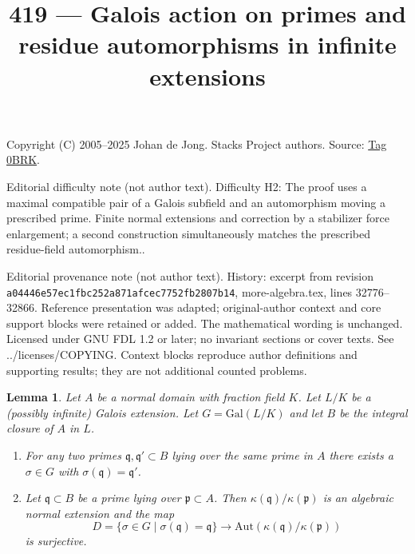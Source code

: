 \documentclass{amsart}
\theoremstyle{plain}
\newtheorem{lemma}[subsection]{Lemma}
\theoremstyle{definition}
\theoremstyle{remark}
\numberwithin{equation}{subsection}
\begin{document}
\title[Stacks Project, Tag 0BRK]{419 --- Galois action on primes and residue automorphisms in infinite extensions}
\maketitle
\noindent Copyright (C) 2005--2025 Johan de Jong. Stacks Project authors. Source: \href{https://stacks.math.columbia.edu/tag/0BRK}{Tag 0BRK}.

\noindent Editorial difficulty note (not author text). Difficulty H2: The proof uses a maximal compatible pair of a Galois subfield and an automorphism moving a prescribed prime. Finite normal extensions and correction by a stabilizer force enlargement; a second construction simultaneously matches the prescribed residue-field automorphism..

\noindent Editorial provenance note (not author text). History: excerpt from revision \texttt{a0444\allowbreak 6e57e\allowbreak c1fbc\allowbreak 252a8\allowbreak 71afc\allowbreak ec775\allowbreak 2fb28\allowbreak 07b14}, more-algebra.tex, lines 32776--32866. Reference presentation was adapted; original-author context and core support blocks were retained or added. The mathematical wording is unchanged. Licensed under GNU FDL 1.2 or later; no invariant sections or cover texts. See ../licenses/COPYING. Context blocks reproduce author definitions and supporting results; they are not additional counted problems.

\begin{lemma}
\label{lemma-one-orbit-geometric-galois}
Let $A$ be a normal domain with fraction field $K$.
Let $L/K$ be a (possibly infinite) Galois extension.
Let $G = \text{Gal}(L/K)$ and let
$B$ be the integral closure of $A$ in $L$.
\begin{enumerate}
\item For any two primes
$\mathfrak q, \mathfrak q' \subset B$ lying over the same prime in $A$
there exists a $\sigma \in G$ with $\sigma(\mathfrak q) = \mathfrak q'$.
\item Let $\mathfrak q \subset B$ be a prime lying over
$\mathfrak p \subset A$. Then $\kappa(\mathfrak q)/\kappa(\mathfrak p)$
is an algebraic normal extension and the map
$$
D = \{\sigma \in G \mid \sigma(\mathfrak q) = \mathfrak q\}
\longrightarrow
\text{Aut}(\kappa(\mathfrak q)/\kappa(\mathfrak p))
$$
is surjective.
\end{enumerate}
\end{lemma}
\end{document}
